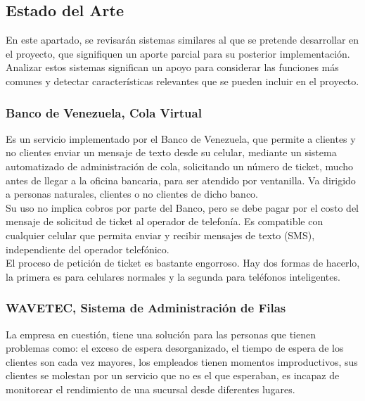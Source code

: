 \subsection{Estado del Arte}

En este apartado, se revisarán sistemas similares al que se pretende desarrollar en el proyecto, que signifiquen un aporte parcial para su posterior implementación. Analizar estos sistemas significan un apoyo para considerar las funciones más comunes y detectar características relevantes que se pueden incluir en el proyecto.\\

\subsubsection{Banco de Venezuela, Cola Virtual}

Es un servicio implementado por el Banco de Venezuela, que permite a clientes y no clientes enviar un mensaje de texto desde su celular, mediante un sistema automatizado de administración de cola, solicitando un número de ticket, mucho antes de llegar a la oficina bancaria, para ser atendido por ventanilla. Va dirigido a personas naturales, clientes o no clientes de dicho banco.\\

Su uso no implica cobros por parte del Banco, pero se debe pagar por el costo del mensaje de solicitud de ticket al operador de telefonía. Es compatible con cualquier celular que permita enviar y recibir mensajes de texto (SMS), independiente del operador telefónico.\\ 

El proceso de petición de ticket es bastante engorroso. Hay dos formas de hacerlo, la primera es para celulares normales y la segunda para teléfonos inteligentes.\\ 


\subsubsection{WAVETEC, Sistema de Administración de Filas}

La empresa en cuestión, tiene una solución para las personas que tienen problemas como: el exceso de espera desorganizado, el tiempo de espera de los clientes son cada vez mayores, los empleados tienen momentos improductivos, sus clientes se molestan por un servicio que no es el que esperaban, es incapaz de monitorear el rendimiento de una sucursal desde diferentes lugares.\\

